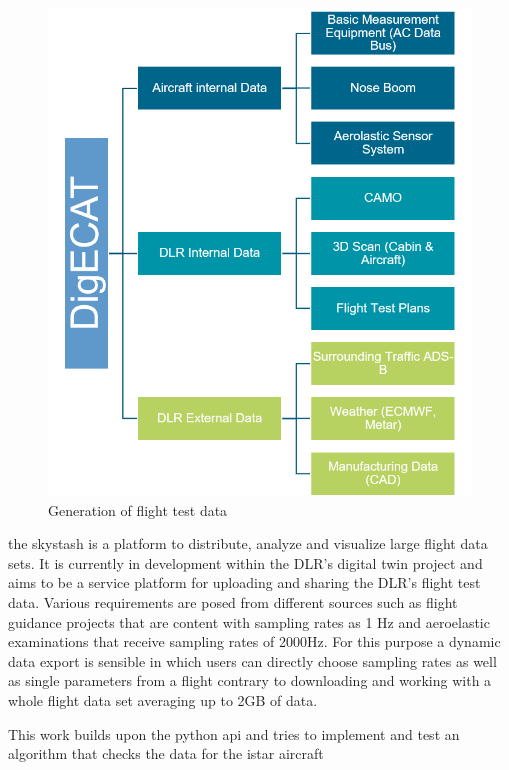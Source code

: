 \begin{figure}[h]
    \centering
    \includegraphics{03_figures/DIGECAT}
    \caption{Generation of flight test data }
\end{figure}

\begin{figure}[h]
    \centering

\end{figure}

the skystash is a platform to distribute, analyze and visualize large flight data sets. It is currently in development within the DLR's digital twin project and aims to be a service platform for uploading and sharing the DLR's flight test data. Various requirements are posed from different sources such as flight guidance projects that are content with sampling rates as 1 Hz and aeroelastic examinations that receive sampling rates of 2000Hz. For this purpose a dynamic data export is sensible in which users can directly choose sampling rates as well as single parameters from a flight contrary to downloading and working with a whole flight data set averaging up to 2GB of data.

This work builds upon the python api and tries to implement and test an algorithm that checks the data for the istar aircraft


